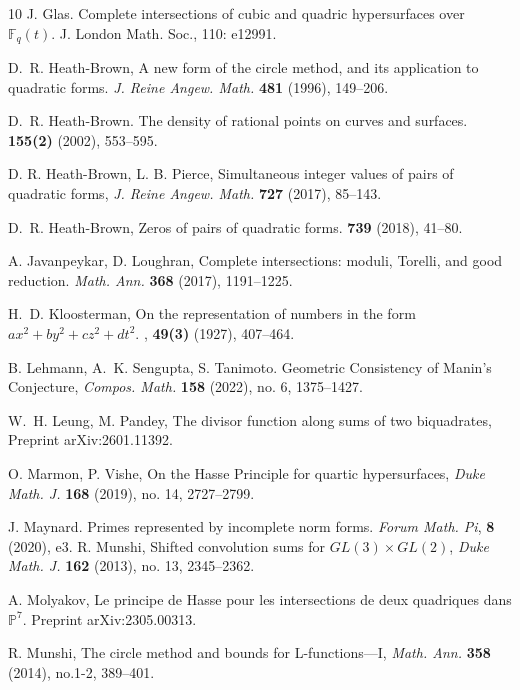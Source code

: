 \documentclass[letterpaper,11pt]{amsart}
\numberwithin{equation}{section}
\theoremstyle{definition}
\numberwithin{equation}{section}
\newcommand{\PP}{\mathbb{P}}
\newcommand{\FF}{\mathbb{F}}
\begin{document}
\begin{thebibliography}{10}
 J. Glas. Complete intersections of cubic and quadric hypersurfaces over $\FF_q(t)$. J. London Math. Soc., 110: e12991.  %
 
D.~R. Heath-Brown, A new form of the circle method, and its application to quadratic
  forms.
 {\em J. Reine Angew. Math.} \textbf{481} (1996), 149--206.
 
D.~R. Heath-Brown.
\newblock The density of rational points on curves and surfaces.
 \textbf{155(2)} (2002), 553--595.

 D. R. Heath-Brown, L. B. Pierce, {Simultaneous integer values of pairs of quadratic forms}, \emph{J. Reine Angew. Math.} \textbf{727} (2017), 85--143.


D.~R. Heath-Brown,
\newblock Zeros of pairs of quadratic forms.
 \textbf{739} (2018), 41--80.

A. Javanpeykar, D. Loughran, 
Complete intersections: moduli, Torelli, and good reduction. {\em Math. Ann.} \textbf{368} (2017), 1191–1225.

H.~D. Kloosterman,
\newblock On the representation of numbers in the form $ax^2+by^2+cz^2+dt^2$.
, \textbf{49(3)}  (1927), 407--464.

 B. Lehmann, A.~K. Sengupta, S. Tanimoto. {Geometric Consistency of Manin’s Conjecture}, {\em Compos. Math.} \textbf{158} (2022), no. 6, 1375–1427. 

W.~H. Leung, M. Pandey, 
The divisor function along sums of two biquadrates, Preprint arXiv:2601.11392.



 O. Marmon, P. Vishe, On the Hasse Principle for quartic hypersurfaces,\emph{ Duke Math. J.} \textbf{168} (2019), no. 14, 2727--2799.

  J. Maynard. Primes represented by incomplete norm forms. {\em Forum Math. Pi}, \textbf{8} (2020), e3.
 R. Munshi,
Shifted convolution sums for  $GL(3)\times GL(2)$, 
{\em Duke Math. J.} \textbf{162} (2013), no. 13, 2345--2362.

 A. Molyakov,  Le principe de Hasse pour les intersections de deux quadriques dans $\PP^7$. Preprint arXiv:2305.00313.

 R. Munshi, 
The circle method and bounds for L-functions—I, {\em Math. Ann.} \textbf{358} (2014), no.1-2, 389--401.


\end{thebibliography}
\end{document}
